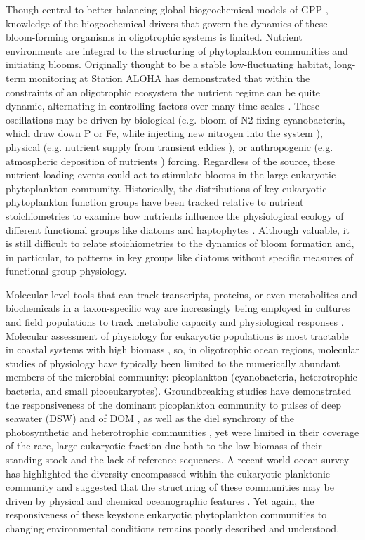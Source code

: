Though central to better balancing global biogeochemical models of GPP \citep{Lopez-Urrutia2006}, knowledge of the biogeochemical drivers that govern the dynamics of these bloom-forming organisms in oligotrophic systems is limited. Nutrient environments are integral to the structuring of phytoplankton communities \citep{Margalef1978, Tilman1977, Cavender-Bares2001} and initiating blooms. Originally thought to be a stable low-fluctuating habitat, long-term monitoring at Station ALOHA has demonstrated that within the constraints of an oligotrophic ecosystem the nutrient regime can be quite dynamic, alternating in controlling factors over many time scales \citep{Karl2001}. These oscillations may be driven by biological (e.g. bloom of N2-fixing cyanobacteria, which draw down P or Fe, while injecting new nitrogen into the system \citep{Karl2002}), physical (e.g. nutrient supply from transient eddies \citep{Benitez-Nelson2007}), or anthropogenic (e.g. atmospheric deposition of nutrients \citep{Kim2014}) forcing.  Regardless of the source, these nutrient-loading events could act to stimulate blooms in the large eukaryotic phytoplankton community.  Historically, the distributions of key eukaryotic phytoplankton function groups have been tracked relative to nutrient stoichiometries to examine how nutrients influence the physiological ecology of different functional groups like diatoms and haptophytes \citep{Cortes2001, Villareal2012}. Although valuable, it is still difficult to relate stoichiometries to the dynamics of bloom formation and, in particular, to patterns in key groups like diatoms without specific measures of functional group physiology. \par
Molecular-level tools that can track transcripts, proteins, or even metabolites and biochemicals in a taxon-specific way are increasingly being employed in cultures and field populations to track metabolic capacity and physiological responses \citep{Marchetti2012a, Alexander2015, Dupont2015, Pearson2015, Ottesen2014, Hennon2015, Dyhrman2012, Amin2015}. Molecular assessment of physiology for eukaryotic populations is most tractable in coastal systems with high biomass \citep{Alexander2015, Dupont2015}, so, in oligotrophic ocean regions, molecular studies of physiology have typically been limited to the numerically abundant members of the microbial community: picoplankton (cyanobacteria, heterotrophic bacteria, and small picoeukaryotes). Groundbreaking studies have demonstrated the responsiveness of the dominant picoplankton community to pulses of deep seawater (DSW) \citep{Shi2012} and of DOM \citep{McCarren2010}, as well as the diel synchrony of the photosynthetic and heterotrophic communities \citep{Ottesen2014}, yet were limited in their coverage of the rare, large eukaryotic fraction due both to the low biomass of their standing stock and the lack of reference sequences. A recent world ocean survey has highlighted the diversity encompassed within the eukaryotic planktonic community \citep{DeVargas2015} and suggested that the structuring of these communities may be driven by physical and chemical oceanographic features \citep{Villar2015}. Yet again, the responsiveness of these keystone eukaryotic phytoplankton communities to changing environmental conditions remains poorly described and understood. 
